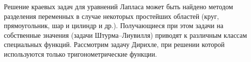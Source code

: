 Решение краевых задач для уравнений Лапласа может быть найдено методом разделения переменных в случае некоторых простейших областей (круг, прямоугольник, шар и цилиндр и др.). Получающиеся при этом задачи на собственные значения (задачи Штурма--Лиувилля) приводят к различным классам специальных функций. Рассмотрим задачу Дирихле, при решении которой используются только тригонометрические функции. 









	

